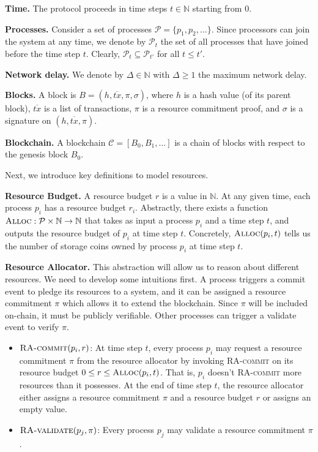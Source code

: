 \documentclass[12pt,draftcls,onecolumn]{IEEEtran}
\newcommand{\Alloc}{\textsc{Alloc}}
\begin{document}

{\bf Time.} The protocol proceeds in time steps $t \in \mathbb{N}$ starting from $0$.

{\bf Processes.} Consider a set of processes $\mathcal{P} = \{ p_1, p_2, \ldots \}$. Since processors can join the system at any time,
we denote by $\mathcal{P}_t$ the set of all processes that have joined before the time step $t$. Clearly, $\mathcal{P}_t \subseteq \mathcal{P}_{t'}$ 
for all $t \le t'$.

{\bf Network delay.} We denote by $\Delta \in \mathbb{N}$ with $\Delta \ge 1$ the maximum network delay.

{\bf Blocks.} A block is $B = (h, \overline{tx}, \pi, \sigma)$, where $h$ is a hash value (of its parent block), $\overline{tx}$ is a list of transactions,
$\pi$ is a resource commitment proof, and $\sigma$ is a signature on $(h, \overline{tx}, \pi)$.

{\bf Blockchain.} A blockchain $\mathcal{C} = [B_0, B_1, \ldots]$ is a chain of blocks with respect to the genesis block $B_0$.

Next, we introduce key definitions to model resources.

{\bf Resource Budget.} A resource budget $r$ is a value in $\mathbb{N}$. At any given time, each process $p_i$ has a resource budget $r_i$.
Abstractly, there exists a function $\Alloc: \mathcal{P} \times \mathbb{N} \to \mathbb{N}$ that takes as input a process $p_i$
and a time step $t$, and outputs the resource budget of $p_i$ at time step $t$. Concretely, $\Alloc(p_i, t)$ tells us the number of storage coins
owned by process $p_i$ at time step $t$.

{\bf Resource Allocator.} This abstraction will allow us to reason about different resources. We need to develop some intuitions first. 
A process triggers a commit event to pledge its resources to a system, and it can be assigned a resource commitment $\pi$ which allows it to extend the blockchain. Since $\pi$ will be included on-chain, it must be publicly verifiable. Other processes can trigger a validate event to verify $\pi$.

\begin{itemize}
    \item $\textsc{RA-commit}(p_i, r)$: At time step $t$, every process $p_i$ may request a resource commitment $\pi$ from the resource allocator
    by invoking \textsc{RA-commit} on its resource budget $0 \le r \le \Alloc(p_i, t)$. That is, $p_i$ doesn't \textsc{RA-commit} more resources than it possesses. At the end of time step $t$, the resource allocator either assigns a resource commitment $\pi$ and a resource budget $r$ or assigns an empty value.

    \item $\textsc{RA-validate}(p_j, \pi)$: Every process $p_j$ may validate a resource commitment $\pi$.
\end{itemize}
\end{document}
